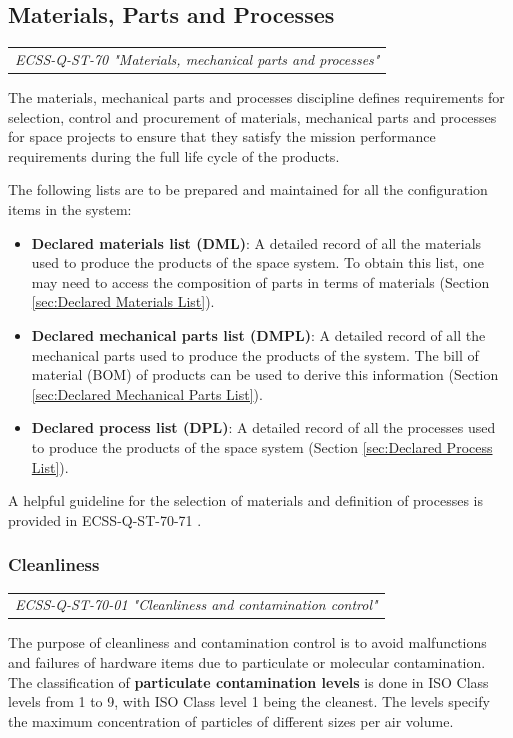 \subsection{Materials, Parts and Processes}

\begin{tabular}{l}
\textit{ECSS-Q-ST-70 "Materials, mechanical parts and processes" \cite{ECSS-Q-ST-70}}
\end{tabular}

The materials, mechanical parts and processes discipline defines requirements for selection, control and procurement of materials, mechanical parts and processes for space projects to ensure that they satisfy the mission performance requirements during the full life cycle of the products. 

The following lists are to be prepared and maintained for all the configuration items in the system:

\begin{itemize}
\item \textbf{Declared materials list (DML)}: A detailed record of all the materials used to produce the products of the space system. To obtain this list, one may need to access the composition of parts in terms of materials (Section \ref{sec:Declared Materials List}).
\item \textbf{Declared mechanical parts list (DMPL)}: A detailed record of all the mechanical parts used to produce the products of the system. The bill of material (BOM) of products can be used to derive this information (Section \ref{sec:Declared Mechanical Parts List}).
\item \textbf{Declared process list (DPL)}: A detailed record of all the processes used to produce the products of the space system (Section \ref{sec:Declared Process List}).
\end{itemize}

A helpful guideline for the selection of materials and definition of processes is provided in ECSS-Q-ST-70-71 \cite{ECSS-Q-ST-70-71}.

\subsubsection{Cleanliness}

\begin{tabular}{l}
\textit{ECSS-Q-ST-70-01 "Cleanliness and contamination control" \cite{ECSS-Q-ST-70-01}}
\end{tabular}

The purpose of cleanliness and contamination control is to avoid malfunctions and failures of hardware items due to particulate or molecular contamination. The classification of \textbf{particulate contamination levels} is done in ISO Class levels from 1 to 9, with ISO Class level 1 being the cleanest. The levels specify the maximum concentration of particles of different sizes per air volume.

